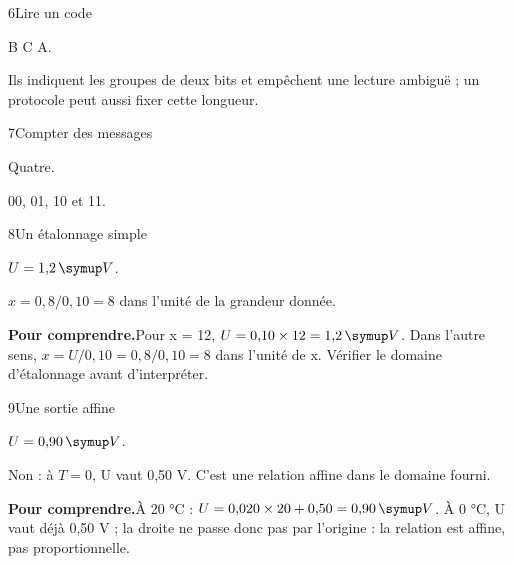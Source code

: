 \par\noindent\begin{minipage}{\linewidth}
\begin{corrige}{6}{Lire un code}
\begin{questions}
\item B C A.
\item Ils indiquent les groupes de deux bits et empêchent une lecture ambiguë ; un protocole peut aussi fixer cette longueur.
\end{questions}
\end{corrige}
\end{minipage}
\par\noindent\begin{minipage}{\linewidth}
\begin{corrige}{7}{Compter des messages}
\begin{questions}
\item Quatre.
\item 00, 01, 10 et 11.
\end{questions}
\end{corrige}
\end{minipage}
\par\noindent\begin{minipage}{\linewidth}
\begin{corrige}{8}{Un étalonnage simple}
\begin{questions}
\item $U=1{,}2\unite V$.
\item $x=0{,}8/0{,}10=8$ dans l’unité de la grandeur donnée.
\end{questions}
\par\smallskip\noindent\textbf{Pour comprendre.}\enspace Pour x = 12, $U=0{,}10\times12=1{,}2\unite V$. Dans l’autre sens, $x=U/0{,}10=0{,}8/0{,}10=8$ dans l’unité de x. Vérifier le domaine d’étalonnage avant d’interpréter.\par
\end{corrige}
\end{minipage}
\par\noindent\begin{minipage}{\linewidth}
\begin{corrige}{9}{Une sortie affine}
\begin{questions}
\item $U=0{,}90\unite V$.
\item Non : à $T=0$, U vaut 0,50 V. C’est une relation affine dans le domaine fourni.
\end{questions}
\par\smallskip\noindent\textbf{Pour comprendre.}\enspace À 20 °C : $U=0{,}020\times20+0{,}50=0{,}90\unite V$. À 0 °C, U vaut déjà 0,50 V ; la droite ne passe donc pas par l’origine : la relation est affine, pas proportionnelle.\par
{}
\end{corrige}
\end{minipage}
